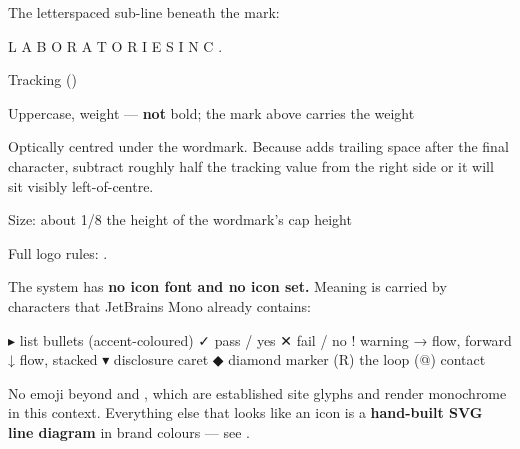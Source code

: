 \documentclass[fontpath=fonts/,logopath=logo/]{riposte-doc}
\begin{document}

The letterspaced sub-line beneath the mark:

\ripcodeopen
{}
\begin{ripcodeblock}
L A B O R A T O R I E S   I N C .
\end{ripcodeblock}
\ripcodesizereset\ripcodeclose

\begin{ripbullets}
\item Tracking \ripmono{.55em} ()
\item Uppercase, weight  — \textbf{not} bold; the mark above carries the weight
\item Optically centred under the wordmark. Because \ripmono{.55em} adds trailing space after the final character, subtract roughly half the tracking value from the right side or it will sit visibly left-of-centre.
\item Size: about 1/8 the height of the wordmark's cap height
\end{ripbullets}

Full logo rules: .



The system has \textbf{no icon font and no icon set.} Meaning is carried by characters that JetBrains Mono already contains:

\ripcodeopen
{}
\begin{ripcodeblock}
▸  list bullets (accent-coloured)
✓  pass / yes            ✕  fail / no            !  warning
→  flow, forward         ↓  flow, stacked        ▾  disclosure caret
◆  diamond marker        (R)  the loop             (@)  contact
\end{ripcodeblock}
\ripcodesizereset\ripcodeclose

No emoji beyond \ripmono{\riploop{}} and \ripmono{\ripmail{}}, which are established site glyphs and render monochrome in this context. Everything else that looks like an icon is a \textbf{hand-built SVG line diagram} in brand colours — see .


\end{document}
